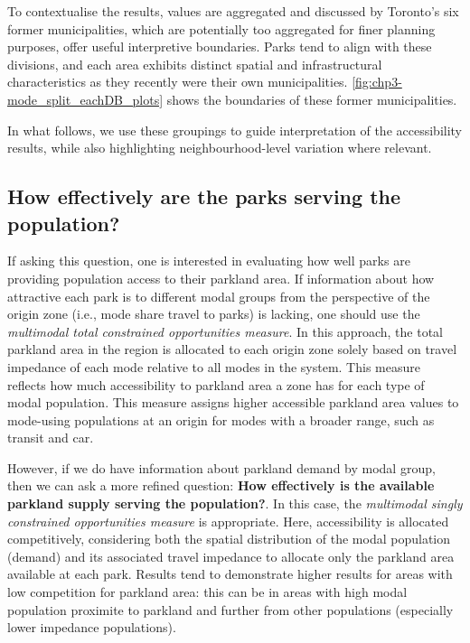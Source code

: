 \documentclass[
11pt, %
oneside, %
english, %
singlespacing, %
]{macthesis} %
\begin{document}
To contextualise the results, values are aggregated and discussed by Toronto's six former municipalities, which are potentially too aggregated for finer planning purposes, offer useful interpretive boundaries. Parks tend to align with these divisions, and each area exhibits distinct spatial and infrastructural characteristics as they recently were their own municipalities. \ref{fig:chp3-mode_split_eachDB_plots} shows the boundaries of these former municipalities.

In what follows, we use these groupings to guide interpretation of the accessibility results, while also highlighting neighbourhood-level variation where relevant.

\subsection{\texorpdfstring{\textbf{How effectively are the parks serving the population?}}{How effectively are the parks serving the population?}}\label{how-effectively-are-the-parks-serving-the-population}

If asking this question, one is interested in evaluating how well parks are providing population access to their parkland area. If information about how attractive each park is to different modal groups from the perspective of the origin zone (i.e., mode share travel to parks) is lacking, one should use the \emph{multimodal total constrained opportunities measure}. In this approach, the total parkland area in the region is allocated to each origin zone solely based on travel impedance of each mode relative to all modes in the system. This measure reflects how much accessibility to parkland area a zone has for each type of modal population. This measure assigns higher accessible parkland area values to mode-using populations at an origin for modes with a broader range, such as transit and car.

However, if we do have information about parkland demand by modal group, then we can ask a more refined question: \textbf{How effectively is the available parkland supply serving the population?}. In this case, the \emph{multimodal singly constrained opportunities measure} is appropriate. Here, accessibility is allocated competitively, considering both the spatial distribution of the modal population (demand) and its associated travel impedance to allocate only the parkland area available at each park. Results tend to demonstrate higher results for areas with low competition for parkland area: this can be in areas with high modal population proximite to parkland and further from other populations (especially lower impedance populations).
\end{document}
